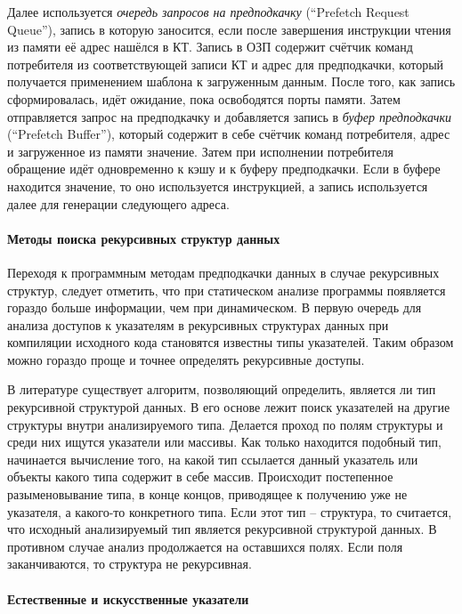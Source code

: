 \documentclass[12pt,a4paper]{article}
\begin{document}
Далее используется \emph{очередь запросов на предподкачку} (``Prefetch Request Queue''), запись в которую заносится, если после завершения инструкции чтения из памяти её адрес нашёлся в КТ. Запись в ОЗП содержит счётчик команд потребителя из соответствующей записи КТ и адрес для предподкачки, который получается применением шаблона к загруженным данным. После того, как запись сформировалась, идёт ожидание, пока освободятся порты памяти. Затем отправляется запрос на предподкачку и добавляется запись в \emph{буфер предподкачки} (``Prefetch Buffer''), который содержит в себе счётчик команд потребителя, адрес и загруженное из памяти значение. Затем при исполнении потребителя обращение идёт одновременно к кэшу и к буферу предподкачки. Если в буфере находится значение, то оно используется инструкцией, а запись используется далее для генерации следующего адреса.

\paragraph{Методы поиска рекурсивных структур данных}

Переходя к программным методам предподкачки данных в случае рекурсивных структур, следует отметить, что при статическом анализе программы появляется гораздо больше информации, чем при динамическом. В первую очередь для анализа доступов к указателям в рекурсивных структурах данных при компиляции исходного кода становятся известны типы указателей. Таким образом можно гораздо проще и точнее определять рекурсивные доступы.

В литературе\cite{LukPhd} существует алгоритм, позволяющий определить, является ли тип рекурсивной структурой данных. В его основе лежит поиск указателей на другие структуры внутри анализируемого типа. Делается проход по полям структуры и среди них ищутся указатели или массивы. Как только находится подобный тип, начинается вычисление того, на какой тип ссылается данный указатель или объекты какого типа содержит в себе массив. Происходит постепенное разыменовывание типа, в конце концов, приводящее к получению уже не указателя, а какого-то конкретного типа. Если этот тип -- структура, то считается, что исходный анализируемый тип является рекурсивной структурой данных. В противном случае анализ продолжается на оставшихся полях. Если поля заканчиваются, то структура не рекурсивная.

\paragraph{Естественные и искусственные указатели}
\end{document}

